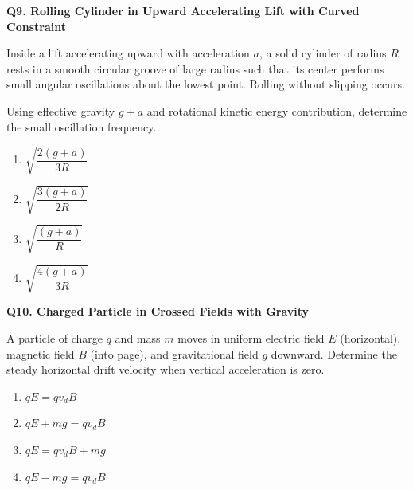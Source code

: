 \documentclass[12pt]{article}
\begin{document}
\textbf{Q9. Rolling Cylinder in Upward Accelerating Lift with Curved Constraint}


Inside a lift accelerating upward with acceleration $a$, a solid cylinder of radius $R$ rests in a smooth circular groove of large radius such that its center performs small angular oscillations about the lowest point. Rolling without slipping occurs.

Using effective gravity $g+a$ and rotational kinetic energy contribution, determine the small oscillation frequency.

\begin{center}
\end{center}

\begin{enumerate}
\item[(A)] $\sqrt{\dfrac{2(g+a)}{3R}}$
\item[(B)] $\sqrt{\dfrac{3(g+a)}{2R}}$
\item[(C)] $\sqrt{\dfrac{(g+a)}{R}}$
\item[(D)] $\sqrt{\dfrac{4(g+a)}{3R}}$
\end{enumerate}

\textbf{Q10. Charged Particle in Crossed Fields with Gravity}

A particle of charge $q$ and mass $m$ moves in uniform electric field $E$ (horizontal), magnetic field $B$ (into page), and gravitational field $g$ downward. Determine the steady horizontal drift velocity when vertical acceleration is zero.

\begin{enumerate}
\item[(A)] $qE = qv_dB$
\item[(B)] $qE + mg = qv_dB$
\item[(C)] $qE = qv_dB + mg$
\item[(D)] $qE - mg = qv_dB$
\end{enumerate}
\end{document}
